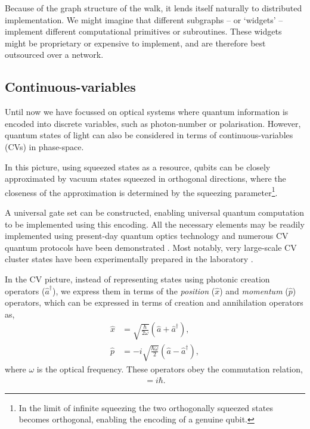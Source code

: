 Because of the graph structure of the walk, it lends itself naturally to distributed implementation. We might imagine that different subgraphs -- or `widgets' \cite{bib:Lovett10, bib:Childs09} -- implement different computational primitives or subroutines. These widgets might be proprietary or expensive to implement, and are therefore best outsourced over a network.

%
%

\subsection{Continuous-variables} \label{sec:CV_QC} 

Until now we have focussed on optical systems where quantum information is encoded into discrete variables, such as photon-number or polarisation. However, quantum states of light can also be considered in terms of continuous-variables (CVs) in phase-space.

In this picture, using squeezed states as a resource, qubits can be closely approximated by vacuum states squeezed in orthogonal directions, where the closeness of the approximation is determined by the squeezing parameter\footnote{In the limit of infinite squeezing the two orthogonally squeezed states becomes orthogonal, enabling the encoding of a genuine qubit.}.

A universal gate set can be constructed, enabling universal quantum computation to be implemented using this encoding. All the necessary elements may be readily implemented using present-day quantum optics technology and numerous CV quantum protocols have been demonstrated \cite{bib:RevModPhys.77.513}. Most notably, very large-scale CV cluster states have been experimentally prepared in the laboratory \cite{nickmenicucci???}.

In the CV picture, instead of representing states using photonic creation operators ($\hat a^\dag$), we express them in terms of the \textit{position} ($\hat x$) and \textit{momentum} ($\hat p$) operators, which can be expressed in terms of creation and annihilation operators as,
\begin{align}
\hat x &=    \sqrt{\frac{\hbar}{2 \omega}}(\hat a + \hat a^\dag), \nonumber \\
\hat p &= -i \sqrt{\frac{\hbar  \omega}{2}}(\hat a - \hat a^\dag), 
\end{align}
where $\omega$ is the optical frequency. These operators obey the commutation relation,
\begin{align}
[\hat x, \hat p] = i \hbar.
\end{align}

